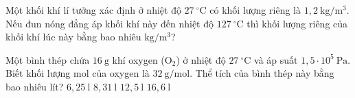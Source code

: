 \begin{ex}
Một khối khí lí tưởng xác định ở nhiệt độ $27\ ^\circ\mathrm{C}$ có khối lượng riêng là $1,2\ \mathrm{kg/m^3}$. Nếu đun nóng đẳng áp khối khí này đến nhiệt độ $127\ ^\circ\mathrm{C}$ thì khối lượng riêng của khối khí lúc này bằng bao nhiêu $\mathrm{kg/m^3}$?
\end{ex}

\begin{ex}
Một bình thép chứa $16\ \mathrm{g}$ khí oxygen ($\mathrm{O_2}$) ở nhiệt độ $27\ ^\circ\mathrm{C}$ và áp suất $1,5 \cdot 10^5\ \mathrm{Pa}$. Biết khối lượng mol của oxygen là $32\ \mathrm{g/mol}$. Thể tích của bình thép này bằng bao nhiêu lít?
\choice
{$6,25\ \mathrm{l}$}
{\True $8,31\ \mathrm{l}$}
{$12,5\ \mathrm{l}$}
{$16,6\ \mathrm{l}$}
\end{ex}

